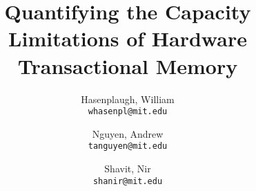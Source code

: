\documentclass{article}
\author{
  Hasenplaugh, William\\
  \texttt{whasenpl@mit.edu}
  \and
  Nguyen, Andrew\\
  \texttt{tanguyen@mit.edu}
  \and
  Shavit, Nir\\
  \texttt{shanir@mit.edu}
}
\title{Quantifying the Capacity Limitations of Hardware Transactional Memory}
\date{}
\begin{document}
\maketitle







\small
\end{document}
